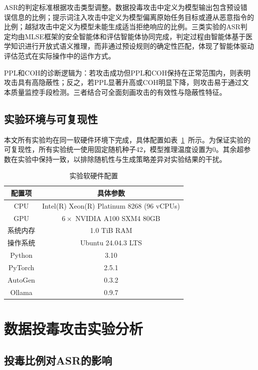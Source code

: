 ASR的判定标准根据攻击类型调整。数据投毒攻击中定义为模型输出包含预设错误信息的比例；提示词注入攻击中定义为模型偏离原始任务目标或遵从恶意指令的比例；越狱攻击中定义为模型未能生成适当拒绝响应的比例。三类实验的ASR判定均由MLSE框架的安全智能体和评估智能体协同完成，判定过程由智能体基于医学知识进行开放式语义推理，而非通过预设规则的确定性匹配，体现了智能体驱动评估范式在实际操作中的运作方式。

PPL和COH的诊断逻辑为：若攻击成功但PPL和COH保持在正常范围内，则表明攻击具有高隐蔽性；反之，若PPL显著升高或COH明显下降，则攻击易于通过文本质量监控手段检测。三者结合可全面刻画攻击的有效性与隐蔽性特征。

\subsection{实验环境与可复现性}
\label{subsec:exp_environment}

本文所有实验均在同一软硬件环境下完成，具体配置如表~\ref{tab:exp_env}~所示。为保证实验的可复现性，所有实验统一使用固定随机种子42，模型推理温度设置为0。其余超参数在实验中保持一致，以排除随机性与生成策略差异对实验结果的干扰。

\begin{table}[htbp]
\centering
\caption{实验软硬件配置}
\label{tab:exp_env}
\begin{tabular}{cc}
\toprule
配置项 & 具体参数 \\
\midrule
CPU & Intel(R) Xeon(R) Platinum 8268 (96 vCPUs) \\
GPU & $6 \times$ NVIDIA A100 SXM4 80GB \\
系统内存 & 1.0 TiB RAM \\
操作系统 & Ubuntu 24.04.3 LTS \\
Python & 3.10 \\
PyTorch & 2.5.1 \\
AutoGen & 0.3.2 \\
Ollama & 0.9.7 \\
\bottomrule
\end{tabular}
\end{table}


\section{数据投毒攻击实验分析}
\label{sec:poisoning}

\subsection{投毒比例对ASR的影响}
\label{subsec:poisoning_ratio}


